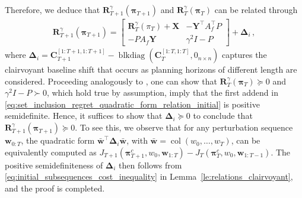 \documentclass[conference]{IEEEtran}
\begin{document}
    Therefore, we deduce that $\mathbf{R}_{T+1}^\gamma(\bm{\pi}_{T+1})$ and $\mathbf{R}_T^\gamma(\bm{\pi}_T)$ can be related through
    \begin{align}
    \label{eq:set_inclusion_regret_quadratic_form_relation_initial}
        \mathbf{R}_{T+1}^\gamma(\bm{\pi}_{T+1}) = \begin{bmatrix}
            \mathbf{R}_T^\gamma(\pi_T) + \mathbf{X} & -\mathbf{Y}^\top A_f^\top P\\
            -P A_f \mathbf{Y} & \gamma^2 I - P
        \end{bmatrix}
        + \bm{\Delta}_{i}\,,
    \end{align}
    where $\bm{\Delta}_i = \mathbf{C}_{T+1}^{[1:T+1, 1:T+1]} - \operatorname{blkdiag}(\mathbf{C}_T^{[1:T, 1:T]}, 0_{n \times n}) $ captures the clairvoyant baseline shift that occurs as planning horizons of different length are considered. Proceeding analogously to \cite[Prop. 3]{goulart2009control}, one can show that $\mathbf{R}_T^\gamma(\bm{\pi}_T) \succeq 0$ and $\gamma^2 I - P \succ 0$, which hold true by assumption, imply that the first addend in \eqref{eq:set_inclusion_regret_quadratic_form_relation_initial} is positive semidefinite. Hence, it suffices to show that $\bm{\Delta}_i \succeq 0$ to conclude that $\mathbf{R}_{T+1}^\gamma(\bm{\pi}_{T+1}) \succeq 0$. To see this, we observe that for any perturbation sequence $\mathbf{w}_{0:T}$, the quadratic form $\bar{\mathbf{w}}^\top \bm{\Delta}_i \bar{\mathbf{w}}$, with $\bar{\mathbf{w}} = \operatorname{col}(w_0, \dots, w_T)$, can be equivalently computed as $J_{T+1}(\bm{\pi}_{T+1}^c, w_0, \mathbf{w}_{1:T}) - J_{T}(\bm{\pi}_{T}^c, w_{0}, \mathbf{w}_{1:T-1})$.
    The positive semidefiniteness of $\bm{\Delta}_i$ then follows from \eqref{eq:initial_subsequences_cost_inequality} in Lemma~\ref{le:relations_clairvoyant}, and the proof is completed.
\end{document}
